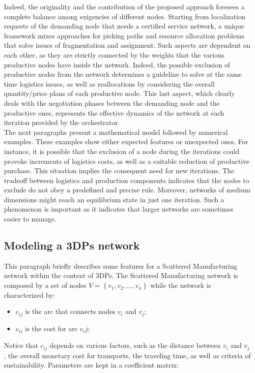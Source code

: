 Indeed, the originality and the contribution of the proposed approach foresees a complete balance among exigencies of different nodes. Starting from localization requests of the demanding node that needs a certified service network, a unique framework mixes approaches for picking paths and resource allocation problems that solve issues of fragmentation and assignment. Such aspects are dependent on each other, as they are strictly connected by the weights that the various productive nodes have inside the network. Indeed, the possible exclusion of productive nodes from the network determines a guideline to solve at the same time logistics issues, as well as reallocations by considering the overall quantity/price plans of each productive node. This last aspect, which clearly deals with the negotiation phases between the demanding node and the productive ones, represents the effective dynamics of the network at each iteration provided by the orchestrator.\\
The next paragraphs present a mathematical model followed by numerical examples. These examples show either expected features or unexpected ones. For instance, it is possible that the exclusion of a node during the iterations could provoke increments of logistics costs, as well as a suitable reduction of productive purchase. This situation implies the consequent need for new iterations. The tradeoff between logistics and production components indicates that the nodes to exclude do not obey a predefined and precise rule. Moreover, networks of medium dimensions might reach an equilibrium state in just one iteration. Such a phenomenon is important as it indicates that larger networks are sometimes easier to manage.

\subsection{Modeling a 3DPs network}
This paragraph briefly describes some features for a Scattered Manufacturing network within the context of 3DPs. The Scattered Manufacturing network is composed by a set of nodes $V = \left\{v_1,v_2,...,v_n \right\}$  while the network is characterized by:
\begin{itemize}
    \item $e_{ij}$ is the arc that connects nodes $v_i$ and $v_j$;
    \item $c_{ij}$ is the cost for arc $e_ij$;
\end{itemize}

Notice that $c_{ij}$ depends on various factors, such as the distance between  $v_i$ and $v_j$, the overall monetary cost for transports, the traveling time, as well as criteria of sustainability. Parameters  are kept in a coefficient matrix:


